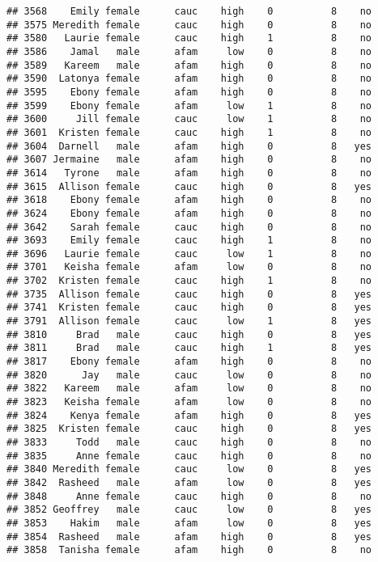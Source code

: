 \documentclass[
]{article}
\begin{document}
\begin{verbatim}
## 3568    Emily female      cauc    high    0          8    no
## 3575 Meredith female      cauc    high    0          8    no
## 3580   Laurie female      cauc    high    1          8    no
## 3586    Jamal   male      afam     low    0          8    no
## 3589   Kareem   male      afam    high    0          8    no
## 3590  Latonya female      afam    high    0          8    no
## 3595    Ebony female      afam    high    0          8    no
## 3599    Ebony female      afam     low    1          8    no
## 3600     Jill female      cauc     low    1          8    no
## 3601  Kristen female      cauc    high    1          8    no
## 3604  Darnell   male      afam    high    0          8   yes
## 3607 Jermaine   male      afam    high    0          8    no
## 3614   Tyrone   male      afam    high    0          8    no
## 3615  Allison female      cauc    high    0          8   yes
## 3618    Ebony female      afam    high    0          8    no
## 3624    Ebony female      afam    high    0          8    no
## 3642    Sarah female      cauc    high    0          8    no
## 3693    Emily female      cauc    high    1          8    no
## 3696   Laurie female      cauc     low    1          8    no
## 3701   Keisha female      afam     low    0          8    no
## 3702  Kristen female      cauc    high    1          8    no
## 3735  Allison female      cauc    high    0          8   yes
## 3741  Kristen female      cauc    high    0          8   yes
## 3791  Allison female      cauc     low    1          8   yes
## 3810     Brad   male      cauc    high    0          8   yes
## 3811     Brad   male      cauc    high    1          8   yes
## 3817    Ebony female      afam    high    0          8    no
## 3820      Jay   male      cauc     low    0          8    no
## 3822   Kareem   male      afam     low    0          8    no
## 3823   Keisha female      afam     low    0          8    no
## 3824    Kenya female      afam    high    0          8   yes
## 3825  Kristen female      cauc    high    0          8   yes
## 3833     Todd   male      cauc    high    0          8    no
## 3835     Anne female      cauc    high    0          8    no
## 3840 Meredith female      cauc     low    0          8   yes
## 3842  Rasheed   male      afam     low    0          8   yes
## 3848     Anne female      cauc    high    0          8    no
## 3852 Geoffrey   male      cauc     low    0          8   yes
## 3853    Hakim   male      afam     low    0          8   yes
## 3854  Rasheed   male      afam    high    0          8   yes
## 3858  Tanisha female      afam    high    0          8    no

\end{verbatim}
\end{document}
